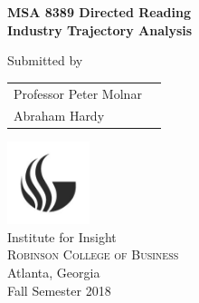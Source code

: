 \begin{titlepage}

\begin{center}

\textup{\small {\bf MSA 8389 Directed Reading} }\\[0.2in]

\Large \textbf {Industry Trajectory Analysis}\\[0.5in]

\vfill

\normalsize Submitted by \\
\begin{table}[h]
\centering
\begin{tabular}{lr}
Professor Peter Molnar \\ 
Abraham Hardy \\ 
\end{tabular}
\end{table}


\vfill

\includegraphics[width=0.18\textwidth]{./gsu_bw}\\[0.1in]
\Large{Institute for Insight}\\
\normalsize
\textsc{Robinson College of Business}\\
Atlanta, Georgia\\
\vspace{0.2cm}
Fall Semester 2018

\end{center}

\end{titlepage}

